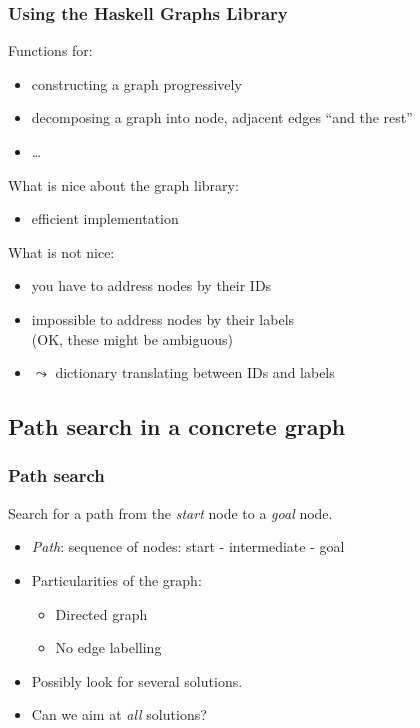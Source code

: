 \begin{frame}[fragile]\frametitle{Using the Haskell Graphs Library}

  Functions for:

  \begin{itemize}
  \item constructing a graph progressively 
  \item decomposing a graph into node, adjacent edges ``and the rest''
  \item \dots
  \end{itemize}

  What is nice about the graph library:
  \begin{itemize}
  \item efficient implementation
  \end{itemize}

  What is not nice:
  \begin{itemize}
  \item you have to address nodes by their IDs
  \item impossible to address nodes by their labels \\
    (OK, these might be ambiguous)
  \item $\leadsto$ dictionary translating between IDs and labels
  \end{itemize}
\end{frame}




\subsection{Path search in a concrete graph}



\begin{frame}[fragile]\frametitle{Path search}

 Search for a path from the \emph{start} node to a
\emph{goal} node.


\begin{itemize}
\item \emph{Path}: sequence of nodes: start -  intermediate - goal
\item Particularities of the graph:
  \begin{itemize}
  \item Directed graph
  \item No edge labelling
  \end{itemize}
\item Possibly look for several solutions.
\item Can we aim at \emph{all} solutions?
\end{itemize}

\end{frame}

